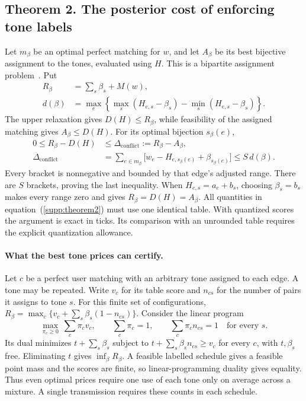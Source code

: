\subsection{Theorem 2. The posterior cost of enforcing tone labels}
Let $m_\beta$ be an optimal perfect matching for $w$, and let $A_\beta$ be its best bijective assignment to the tones, evaluated using $H$. This is a bipartite assignment problem~\cite{kuhn}. Put
\begin{equation}
 \begin{aligned}
 R_\beta&=\sum_s\beta_s+M(w),\\
 d(\beta)&=\max_e\left\{\max_s(H_{e,s}-\beta_s)
                         -\min_s(H_{e,s}-\beta_s)\right\}.
 \end{aligned}
 \label{supp:conflict-definitions}
\end{equation}
The upper relaxation gives $D(H)\le R_\beta$, while feasibility of the assigned matching gives $A_\beta\le D(H)$. For its optimal bijection $s_\beta(e)$,
\begin{equation}
 \begin{aligned}
 0\le R_\beta-D(H)&\le\Delta_{\mathrm{conflict}}:=R_\beta-A_\beta,\\
 \Delta_{\mathrm{conflict}}
 &=\sum_{e\in m_\beta}\bigl[w_e-H_{e,s_\beta(e)}+\beta_{s_\beta(e)}\bigr]
 \le S\,d(\beta).
 \end{aligned}
 \label{supp:theorem2}
\end{equation}
Every bracket is nonnegative and bounded by that edge's adjusted range. There are $S$ brackets, proving the last inequality. When $H_{e,s}=a_e+b_s$, choosing $\beta_s=b_s$ makes every range zero and gives $R_\beta=D(H)=A_\beta$. All quantities in equation~(\ref{supp:theorem2}) must use one identical table. With quantized scores the argument is exact in ticks. Its comparison with an unrounded table requires the explicit quantization allowance.

\paragraph{What the best tone prices can certify.}
Let \(c\) be a perfect user matching with an arbitrary tone assigned to each edge. A tone may be repeated. Write \(v_c\) for its table score and \(n_{cs}\) for the number of pairs it assigns to tone \(s\). For this finite set of configurations, \(R_\beta=\max_c\{v_c+\sum_s\beta_s(1-n_{cs})\}\). Consider the linear program
\[
 \max_{\pi_c\ge0}\ \sum_c\pi_c v_c,\qquad
 \sum_c\pi_c=1,\qquad \sum_c\pi_c n_{cs}=1\quad\text{for every }s .
\]
Its dual minimizes \(t+\sum_s\beta_s\) subject to \(t+\sum_s\beta_s n_{cs}\ge v_c\) for every \(c\), with \(t,\beta_s\) free. Eliminating \(t\) gives \(\inf_\beta R_\beta\). A feasible labelled schedule gives a feasible point mass and the scores are finite, so linear-programming duality gives equality. Thus even optimal prices require one use of each tone only on average across a mixture. A single transmission requires these counts in each schedule.


